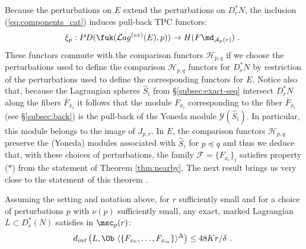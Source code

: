 Because the perturbations on $E$ extend the perturbations on $D^{\ast}_{r}N$, the inclusion (\ref{eq:components_cat}) induces  
 pull-back TPC functors:
$$\xi_{p}:PD(\fuk(\mathcal{L}ag^{(ex)}(E), p)) \to H(F\md_{\mathcal{A}_{p}(r)})~.~$$
These functors commute with the comparison functors $\mathcal{H}_{p,q}$ if we  choose the perturbations used to define the comparison $\mathcal{H}_{p,q}$ functors for $D^{\ast}_{r}N$ by restriction of the perturbations used to define the corresponding functors for $E$. Notice also that, because the Lagrangian spheres $\hat{S}_{i}$ from \S\ref{subsec:exact-seq} intersect 
$D^{\ast}_{r}N$ along the fibers $\overline{F}_{x_{i}}$ it follows
that the module $F_{x_{i}}$ corresponding to the fiber $\overline{F}_{x_{i}}$ (see \S\ref{subsec:back}) is the pull-back of the Yoneda module $\mathcal{Y}(\hat{S}_{i})$. In particular, this module belongs to the image of $J_{p,r}$.  In $E$, the comparison functors $\mathcal{H}_{p,q}$ preserve the (Yoneda) modules associated with $\hat{S}_{i}$ for $p\preceq q$ and thus we deduce that, with these choices of perturbations, the family
$\mathcal{F}=\{F_{x_{i}}\}_{i}$ satisfies property ($\ast$)
from  the statement of Theorem \ref{thm:nearby}.
The next result brings us very close to the statement of this  theorem .

\begin{prop}\label{prop:estimates-in-r}
Assuming the setting and notation above, for $r$ sufficiently small and for a choice of perturbations $p$ with $\nu(p)$ sufficiently small, any exact, marked Lagrangian $L\subset D^{\ast}_{r}(N)$ satisfies in $\msc_{p}(r)$:
$$d_{int}\left( L, \Ob\  \langle\{F_{x_{0}},\ldots, F_{x_{m}}\} \rangle^{\Delta}\right) \leq 48 Kr/\delta~.~$$  
\end{prop}

